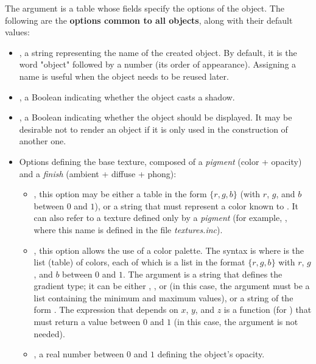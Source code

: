 The argument  is a table whose fields specify the options of the object. The following are the \textbf{options common to all objects}, along with their default values:
\begin{itemize}
    \item {}, a string representing the name of the created object. By default, it is the word "object" followed by a number (its order of appearance). Assigning a name is useful when the object needs to be reused later.

    \item {}, a Boolean indicating whether the object casts a shadow.

    \item {}, a Boolean indicating whether the object should be displayed. It may be desirable not to render an object if it is only used in the construction of another one.

    \item Options defining the base texture, composed of a \emph{pigment} (color + opacity) and a \emph{finish} (ambient + diffuse + phong):
        \begin{itemize}
            \item {}, this option may be either a table in the form $\{r,g,b\}$ (with $r$, $g$, and $b$ between $0$ and $1$), or a string that must represent a color known to \povray. It can also refer to a texture defined only by a \emph{pigment} (for example, , where this name is defined in the file \emph{textures.inc}).

            \item {}, this option allows the use of a color palette. The syntax is  where  is the list (table) of colors, each of which is a list in the format $\{r,g,b\}$ with $r$, $g$, and $b$ between $0$ and $1$. The argument  is a string that defines the gradient type; it can be either , , or  (in this case, the argument  must be a list containing the minimum and maximum values), or a string of the form . The expression that depends on $x$, $y$, and $z$ is a function (for \povray) that must return a value between $0$ and $1$ (in this case, the  argument is not needed).
            
            \item {}, a real number between $0$ and $1$ defining the object’s opacity.


\end{itemize}
\end{itemize}
